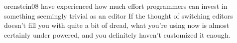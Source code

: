 \begin{fullquote}{orenstein08}{%
  have experienced how much effort programmers can
  invest in something seemingly trivial as an editor}
    If the thought of switching editors doesn't fill you with quite a bit of
    dread, what you're using now is almost certainly under powered, and you
    definitely haven't customized it enough.
\end{fullquote}
